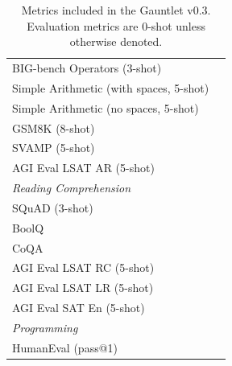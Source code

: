 \documentclass[10pt]{article} %
\begin{document}
\begin{table}[!ht]
\begin{tabular}{l p{6cm}}
         \quad BIG-bench Operators (3-shot) & \citep{srivastava2022beyond} \\
         \quad Simple Arithmetic (with spaces, 5-shot) & \citep{mosaicml2023mpt} \\
         \quad Simple Arithmetic (no spaces, 5-shot) & \citep{mosaicml2023mpt}  \\
         \quad GSM8K (8-shot) & \citep{cobbe2021training} \\
         \quad SVAMP (5-shot) & \citep{patel2021svamp} \\
         \quad AGI Eval LSAT AR (5-shot) & \citep{zhong2023agieval} \\
         \midrule
         \textit{Reading Comprehension} \\
         \quad SQuAD (3-shot) & \citep{rajpurkar2016squad} \\
         \quad BoolQ & \citep{clark2019boolq} \\
         \quad CoQA & \citep{reddy2019coqa} \\
         \quad AGI Eval LSAT RC (5-shot) & \citep{zhong2023agieval} \\
         \quad AGI Eval LSAT LR (5-shot) &  \citep{zhong2023agieval} \\
         \quad AGI Eval SAT En (5-shot) & \citep{zhong2023agieval} \\
         \midrule 
         \textit{Programming} \\
         \quad HumanEval (pass@1) & \citep{chen2021evaluating} \\
         \bottomrule
    \end{tabular}
    \caption{Metrics included in the Gauntlet v0.3. Evaluation metrics are 0-shot unless otherwise denoted.}
    \label{tab:gauntlet-v3}
\end{table}


\end{document}
